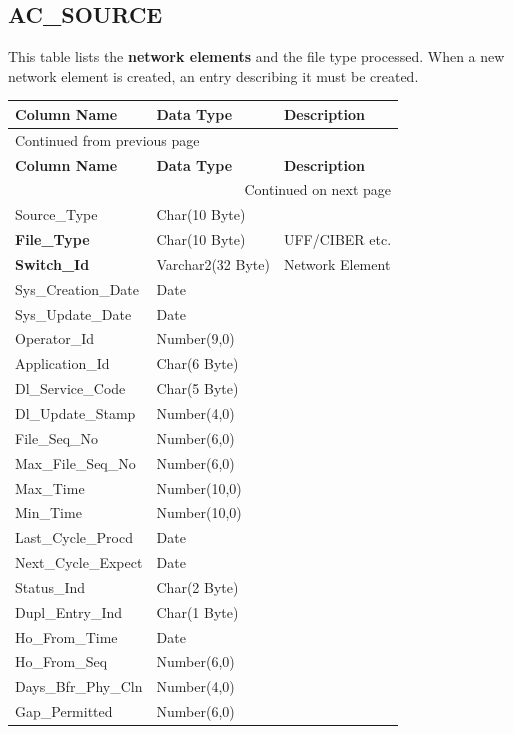\documentclass[12pt,twoside]{article}
\begin{document}
\subsection{AC\_SOURCE}
\label{sec:orgheadline29}
This table lists the \textbf{network elements} and the file type processed. When a new network element is created, an entry describing it must be created.
\footnotesize

\begin{longtable}{l|l|l}
\hline
\textbf{Column Name} & \textbf{Data Type} & \textbf{Description}\\
\hline
\endfirsthead
\multicolumn{3}{l}{Continued from previous page} \\
\hline

\textbf{Column Name} & \textbf{Data Type} & \textbf{Description} \\

\hline
\endhead
\hline\multicolumn{3}{r}{Continued on next page} \\
\endfoot
\endlastfoot
\hline
Source\_Type & Char(10 Byte) & \\
\textbf{File\_Type} & Char(10 Byte) & UFF/CIBER etc.\\
\textbf{Switch\_Id} & Varchar2(32 Byte) & Network Element\\
Sys\_Creation\_Date & Date & \\
Sys\_Update\_Date & Date & \\
Operator\_Id & Number(9,0) & \\
Application\_Id & Char(6 Byte) & \\
Dl\_Service\_Code & Char(5 Byte) & \\
Dl\_Update\_Stamp & Number(4,0) & \\
File\_Seq\_No & Number(6,0) & \\
Max\_File\_Seq\_No & Number(6,0) & \\
Max\_Time & Number(10,0) & \\
Min\_Time & Number(10,0) & \\
Last\_Cycle\_Procd & Date & \\
Next\_Cycle\_Expect & Date & \\
Status\_Ind & Char(2 Byte) & \\
Dupl\_Entry\_Ind & Char(1 Byte) & \\
Ho\_From\_Time & Date & \\
Ho\_From\_Seq & Number(6,0) & \\
Days\_Bfr\_Phy\_Cln & Number(4,0) & \\
Gap\_Permitted & Number(6,0) & \\
\hline
\end{longtable}
\end{document}
